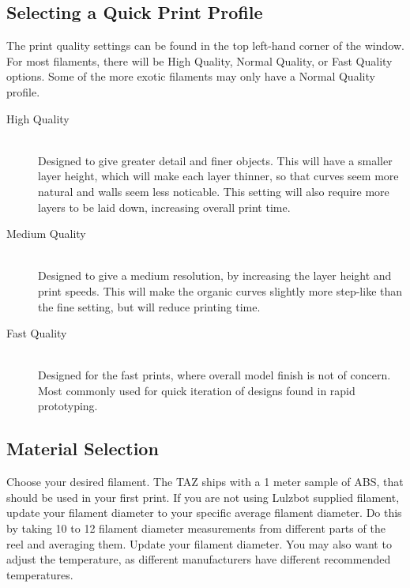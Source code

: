 \subsection{Selecting a Quick Print Profile}
The print quality settings can be found in the top left-hand corner of the window. For most filaments, there will be High Quality, Normal Quality, or Fast Quality options. Some of the more exotic filaments may only have a Normal Quality profile.

\begin{description}
\item[High Quality] \hfill \\
Designed to give greater detail and finer objects. This will have a smaller layer height, which will make each layer thinner, so that curves seem more natural and walls seem less noticable. This setting will also require more layers to be laid down, increasing overall print time.

\item[Medium Quality] \hfill \\
Designed to give a medium resolution, by increasing the layer height and print speeds. This will make the organic curves slightly more step-like than the fine setting, but will reduce printing time.

\item[Fast Quality] \hfill \\
Designed for the fast prints, where overall model finish is not of concern. Most commonly used for quick iteration of designs found in rapid prototyping.
\end{description}

\subsection{Material Selection}
Choose your desired filament. The TAZ ships with a 1 meter sample of ABS, that should be used in your first print.
If you are not using Lulzbot supplied filament, update your filament diameter to your specific average filament diameter. Do this by taking 10 to 12 filament diameter measurements from different parts of the reel and averaging them. Update your filament diameter. You may also want to adjust the temperature, as different manufacturers have different recommended temperatures. %

